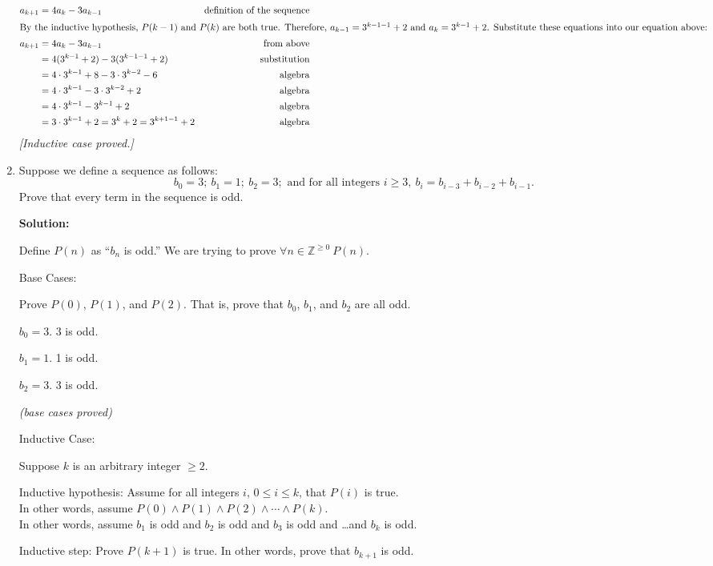 \documentclass[11pt, letterpaper]{report}
\newcommand{\Z}{\mathbb{Z}}
\begin{document}
\begin{enumerate}
\begin{align*}
a_{k+1} &= 4a_{k} - 3a_{k-1} &\text{definition of the sequence}\\
\intertext{By the inductive hypothesis, $P(k-1)$ and $P(k)$ are both true.  Therefore, $a_{k-1} = 3^{k-1-1}+2$ and $a_k = 3^{k-1}+2$.  Substitute these equations into our equation above:}
a_{k+1} &= 4a_{k} - 3a_{k-1} &\text{from above}\\
&= 4(3^{k-1}+2) - 3(3^{k-1-1}+2) &\text{substitution}\\
&= 4\cdot 3^{k-1}+8 - 3\cdot 3^{k-2}-6 &\text{algebra}\\
&= 4\cdot 3^{k-1}- 3\cdot 3^{k-2}+2 &\text{algebra}\\
&= 4\cdot 3^{k-1}-  3^{k-1}+2 &\text{algebra}\\
&= 3\cdot 3^{k-1} +2 = 3^{k}+2 = 3^{k+1-1}+2&\text{algebra}
\end{align*}
\textit{[Inductive case proved.]}

\item Suppose we define a sequence as follows: 
$$
b_0 = 3; \ b_1 = 1; \ b_2 = 3; \text{ and for all integers }i \geq 3, \ b_i = b_{i-3} + b_{i-2}  +b_{i-1}. 
$$
Prove that every term in the sequence is odd.

\textbf{Solution:}

Define $P(n)$ as ``$b_n$ is odd.''  We are trying to prove $\forall n \in \Z^{\geq 0} \ P(n)$.

Base Cases:

Prove $P(0)$, $P(1)$, and $P(2)$.  That is, prove that $b_0$, $b_1$, and $b_2$ are all odd.

$b_0 = 3$.  3 is odd. \ \ \checkmark 

$b_1 = 1$.  1 is odd. \ \ \checkmark 

$b_2 = 3$.  3 is odd. \ \ \checkmark 

\textit{(base cases proved)}

Inductive Case:

Suppose $k$ is an arbitrary integer $\geq 2$.

Inductive hypothesis: Assume for all integers $i$, $0 \leq i \leq k$, that $P(i)$ is true.\\
In other words, assume $P(0) \land P(1) \land P(2) \land \cdots \land P(k)$.\\
In other words, assume $b_1$ is odd and $b_2$ is odd and $b_3$ is odd and \ldots and $b_k$ is odd.

Inductive step: Prove $P(k+1)$ is true.  In other words, prove that $b_{k+1}$ is odd.


\end{enumerate}
\end{document}
